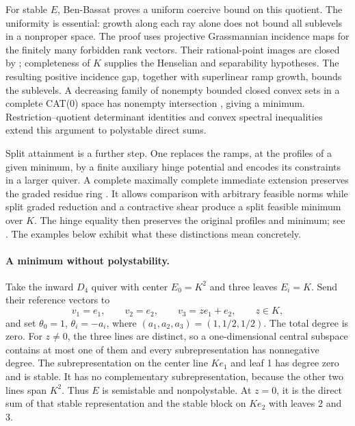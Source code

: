 For stable $E$, Ben-Bassat proves a uniform coercive bound on this
quotient. The uniformity is essential: growth along each ray alone
does not bound all sublevels in a nonproper space. The proof uses
projective Grassmannian incidence maps for the finitely many forbidden
rank vectors. Their rational-point images are closed by
\cite[Theorem~1.3 and \S4.3.1]{MoretBailly12ClosedImageV3}; completeness
of $K$ supplies the Henselian and separability hypotheses. The resulting
positive incidence gap, together with superlinear ramp growth, bounds the
sublevels. A decreasing family of nonempty bounded closed convex sets
in a complete CAT(0) space has nonempty intersection
\cite[Proposition~2.12]{Parreau00AffineAuthor}, giving a minimum.
Restriction--quotient determinant identities and convex spectral
inequalities extend this argument to polystable direct sums.

Split attainment is a further step. One replaces the ramps, at the
profiles of a given minimum, by a finite auxiliary hinge potential and
encodes its constraints in a larger quiver. A complete maximally complete
immediate extension preserves the graded residue ring
\cite[Corollary~6 and Proposition~6(1)]{Poonen93MaximalAuthor}.
It allows comparison with arbitrary feasible norms while split graded
reduction and a contractive shear produce a split feasible minimum over
$K$. The hinge equality then preserves the original profiles and minimum;
see \cite[\S\S4.2--5]{BB26HarmonicQuiverV1}.
The examples below exhibit what these distinctions mean concretely.

\paragraph{A minimum without polystability.}
Take the inward $D_4$ quiver with center $E_0=K^2$ and three leaves
$E_i=K$. Send their reference vectors to
\[
 v_1=e_1,\qquad v_2=e_2,\qquad v_3=ze_1+e_2,
 \qquad z\in K,
\]
and set $\theta_0=1$, $\theta_i=-a_i$, where
$(a_1,a_2,a_3)=(1,1/2,1/2)$. The total degree is zero.
For $z\ne0$, the three lines are distinct, so a one-dimensional central
subspace contains at most one of them and every subrepresentation has
nonnegative degree. The subrepresentation on the center line $Ke_1$
and leaf 1 has degree zero and is stable. It has no complementary
subrepresentation, because the other two lines span $K^2$.
Thus $E$ is semistable and nonpolystable. At $z=0$, it is the direct
sum of that stable representation and the stable block on $Ke_2$
with leaves 2 and 3.

